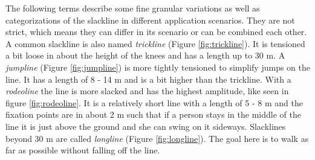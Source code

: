 The following terms describe some fine granular variations as well as categorizations of the slackline in different application scenarios. They are not strict, which means they can differ in its scenario or can be combined each other. A common slackline is also named \textit{trickline} (Figure \ref{fig:trickline}). It is tensioned a bit loose in about the height of the knees and has a length up to 30 m. A \textit{jumpline} (Figure \ref{fig:jumpline}) is more tightly tensioned to simplify jumps on the line. It has a length of 8 - 14 m and is a bit higher than the trickline. With a \textit{rodeoline} the line is more slacked and has the highest amplitude, like seen in figure \ref{fig:rodeoline}. It is a relatively short line with a length of 5 - 8 m and the fixation points are in about 2 m such that if a person stays in the middle of the line it is just above the ground and she can swing on it sideways. Slacklines beyond 30 m are called \textit{longline} (Figure \ref{fig:longline}). The goal here is to walk as far as possible without falling off the line.

